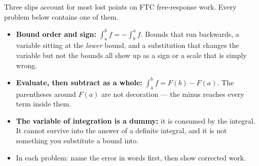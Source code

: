 \documentclass[12pt]{article}
\begin{document}

\noindent\small Three slips account for most lost points on FTC free-response
work. Every problem below contains one of them.
\begin{itemize}[leftmargin=0.8cm, itemsep=1pt, topsep=2pt]
  \item \textbf{Bound order and sign:} $\int_a^b f = -\int_b^a f$. Bounds that
        run backwards, a variable sitting at the \emph{lower} bound, and a
        substitution that changes the variable but not the bounds all show up as
        a sign or a scale that is simply wrong.
  \item \textbf{Evaluate, then subtract as a whole:} $\int_a^b f = F(b) - F(a)$.
        The parentheses around $F(a)$ are not decoration --- the minus reaches
        every term inside them.
  \item \textbf{The variable of integration is a dummy:} it is consumed by the
        integral. It cannot survive into the answer of a definite integral, and
        it is not something you substitute a bound into.
  \item In each problem: name the error in words first, then show corrected work.
\end{itemize}
\normalsize

\vspace{0.2cm}



\end{document}
